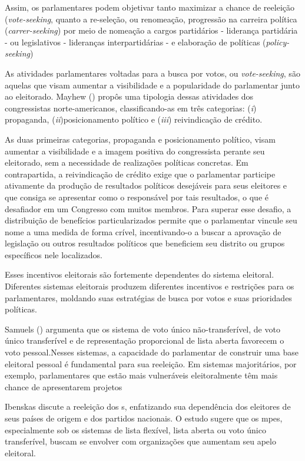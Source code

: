 Assim, os parlamentares podem objetivar tanto maximizar a chance de reeleição (\textit{vote-seeking}, quanto a re-seleção, ou renomeação, progressão na carreira política (\textit{carrer-seeking}) por meio de nomeação a cargos partidários - liderança partidária - ou legislativos - lideranças interpartidárias - \cite{strom1997rules} e elaboração de políticas (\textit{policy-seeking}) \cite{muller1999}

As atividades parlamentares voltadas para a busca por votos, ou \textit{vote-seeking}, são aquelas que visam aumentar a visibilidade e a popularidade do parlamentar junto ao eleitorado. Mayhew (\citeyear{mayhew2004congress}) propôs uma tipologia dessas atividades dos congressistas norte-americanos, classificando-as em três categorias: (\textit{i}) propaganda, (\textit{ii})posicionamento político e (\textit{iii}) reivindicação de crédito. 

As duas primeiras categorias, propaganda e posicionamento político, visam aumentar a visibilidade e a imagem positiva do congressista perante seu eleitorado, sem a necessidade de realizações políticas concretas. Em contrapartida, a reivindicação de crédito exige que o parlamentar participe ativamente da produção de resultados políticos desejáveis para seus eleitores e que consiga se apresentar como o responsável por tais resultados, o que é desafiador em um Congresso com muitos membros. Para superar esse desafio, a distribuição de benefícios particularizados permite que o parlamentar vincule seu nome a uma medida de forma crível, incentivando-o a buscar a aprovação de legislação ou outros resultados políticos que beneficiem seu distrito ou grupos específicos nele localizados.

Esses incentivos eleitorais são fortemente dependentes do sistema eleitoral. Diferentes sistemas eleitorais produzem diferentes incentivos e restrições para os parlamentares, moldando suas estratégias de busca por votos e suas prioridades políticas. 

Samuels (\citeyear{samuels1997determinantes}) argumenta que os sistema de voto único não-transferível, de voto único transferível e de representação proporcional de lista aberta favorecem o voto pessoal.Nesses sistemas, a capacidade do parlamentar de construir uma base eleitoral pessoal é fundamental para sua reeleição. Em sistemas majoritários, por exemplo, parlamentares que estão mais vulneráveis eleitoralmente têm mais chance de apresentarem projetos \cite{bowler2010private}

Ibenskas \citeyear{Ibenskas2021} discute a reeleição dos s, enfatizando sua dependência dos eleitores de seus países de origem e dos partidos nacionais. O estudo sugere que os \acrshort{mpe}s, especialmente sob os sistemas de lista flexível, lista aberta ou voto único transferível, buscam se envolver com organizações que aumentam seu apelo eleitoral.

